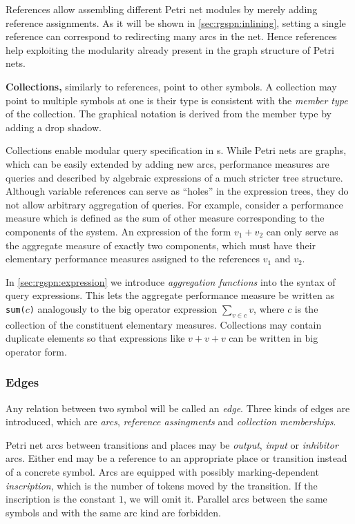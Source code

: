 References allow assembling different Petri net modules by merely adding reference assignments. As it will be shown in \vref{sec:rgspn:inlining}, setting a single reference can correspond to redirecting many arcs in the net. Hence references help exploiting the modularity already present in the graph structure of Petri nets.

\newpara \textbf{Collections,} similarly to references, point to other symbols. A collection may point to multiple symbols at one is their type is consistent with the \emph{member type} of the collection. The graphical notation is derived from the member type by adding a drop shadow.

Collections enable modular query specification in s. While Petri nets are graphs, which can be easily extended by adding new arcs, performance measures are queries and described by algebraic expressions of a much stricter tree structure. Although variable references can serve as \enquote{holes} in the expression trees, they do not allow arbitrary aggregation of queries. For example, consider a performance measure which is defined as the sum of other measure corresponding to the components of the system. An expression of the form \(v_1 + v_2\) can only serve as the aggregate measure of exactly two components, which must have their elementary performance measures assigned to the references \(v_1\) and \(v_2\).

In \vref{sec:rgspn:expression} we introduce \emph{aggregation functions} into the syntax of query expressions. This lets the aggregate performance measure be written as \texttt{sum(\(c\))} analogously to the big operator expression \(\sum_{v \in c} v\), where \(c\) is the collection of the constituent elementary measures. Collections may contain duplicate elements so that expressions like \(v + v + v\) can be written in big operator form.

\subsubsection{Edges}

Any relation between two  symbol will be called an \emph{edge}. Three kinds of edges are introduced, which are \emph{arcs}, \emph{reference assingments} and \emph{collection memberships}.

Petri net arcs between transitions and places may be \emph{output}, \emph{input} or \emph{inhibitor} arcs. Either end may be a reference to an appropriate place or transition instead of a concrete symbol. Arcs are equipped with possibly marking-dependent \emph{inscription}, which is the number of tokens moved by the transition. If the inscription is the constant \(1\), we will omit it. Parallel arcs between the same symbols and with the same arc kind are forbidden.

